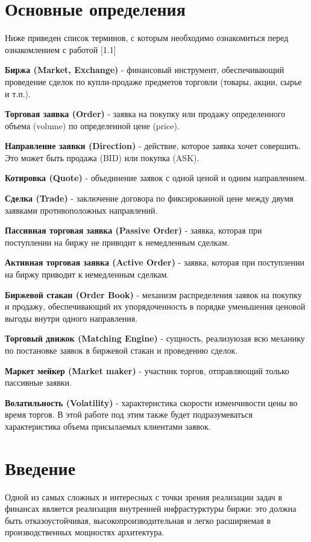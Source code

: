 
\section{Основные определения}

Ниже приведен список терминов, с которым необходимо ознакомиться перед ознакомлением с работой [1.1] 

\textbf{Биржа (Market, Exchange)} - финансовый инструмент, обеспечивающий проведение сделок по купли-продаже предметов торговли (товары, акции, сырье и т.п.).

\textbf{Торговая заявка (Order)} - заявка на покупку или продажу определенного объема (volume) по определенной цене (price).


\textbf{Направление заявки (Direction)} - действие, которое заявка хочет совершить. Это может быть продажа (BID) или покупка (ASK).

\textbf{Котировка (Quote)} - объединение заявок с одной ценой и одним направлением.

\textbf{Сделка (Trade)} - заключение договора по фиксированной цене между двумя заявками противоположных направлений.

\textbf{Пассивная торговая заявка (Passive Order)} - заявка, которая при поступлении на биржу не приводит к немедленным сделкам.

\textbf{Активная торговая заявка (Active Order)} - заявка, которая при поступлении на биржу приводит к немедленным сделкам.

\textbf{Биржевой стакан (Order Book)} - механизм распределения заявок на покупку и продажу, обеспечивающий их упорядоченность в порядке уменьшения ценовой выгоды внутри одного направления.

\textbf{Торговый движок (Matching Engine)} - сущность, реализуюзая всю механику по постановке заявок в биржевой стакан и проведению сделок.

\textbf{Маркет мейкер (Market maker)} - участник торгов, отправляющий только пассивные заявки.

\textbf{Волатильность (Volatility)} - характеристика скорости изменчивости цены во время торгов. В этой работе под этим также будет подразумеваться характеристика объема присылаемых клиентами заявок.

\newpage

\section{Введение}

Одной из самых сложных и интересных с точки зрения реализации задач в финансах
является реализация внутренней инфрастурктуры биржи: это должна быть отказоустойчивая, высокопроизводительная и легко расширяемая в производственных мощностях архитектура.

